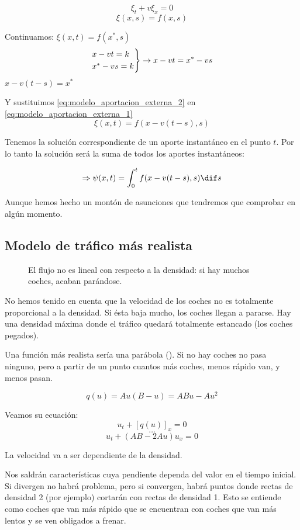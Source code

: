 			$$\xi_t + v\xi_x = 0$$
			$$\xi(x,s) = f(x,s)$$

			Continuamos:
			\(\xi(x,t) = f(x^*,s) \label{eq:modelo_aportacion_externa_1}\)
			$$
			\begin{rcases}
				x-vt = k \\
				x^* - vs = k
			\end{rcases}
			 \rightarrow x-vt = x^* - vs
			$$
			\( x-v(t-s) = x^{*} \label{eq:modelo_aportacion_externa_2} \)

			Y sustituimos \ref{eq:modelo_aportacion_externa_2} en \ref{eq:modelo_aportacion_externa_1}
			$$\xi(x,t) = f(x - v(t-s), s)$$


			Tenemos la solución correspondiente de un aporte instantáneo en el punto $t$. Por lo tanto la solución será la suma de todos los aportes instantáneos:

			$$\Rightarrow \psi(x,t) = \int^{t}_{0} f(x-v(t-s),s) \dif s $$

			Aunque hemos hecho un montón de asunciones que tendremos que comprobar en algún momento.

	\subsection{Modelo de tráfico más realista}

		\begin{wrapfigure}{r}{0.4\textwidth}
			\centering
			\caption{El flujo no es lineal con respecto a la densidad: si hay muchos coches, acaban parándose.}
			\label{fig:parabola}
		\end{wrapfigure}

		No hemos tenido en cuenta que la velocidad de los coches no es totalmente proporcional a la densidad. Si ésta baja mucho, los coches llegan a pararse. Hay una densidad máxima donde el tráfico quedará totalmente estancado (los coches pegados).

		Una función más realista sería una parábola (). Si no hay coches no pasa ninguno, pero a partir de un punto cuantos más coches, menos rápido van, y menos pasan.

		$$ q(u) = Au (B-u) = ABu - Au^{2} $$

		Veamos su ecuación:
		$$u_t + [q(u)]_x = 0$$
		$$ … $$
		$$ u_t + (AB - 2Au) u_x = 0 $$

		La velocidad va a ser dependiente de la densidad.

		Nos saldrán características cuya pendiente dependa del valor en el tiempo inicial. Si divergen no habrá problema, pero si convergen, habrá puntos donde rectas de densidad 2 (por ejemplo) cortarán con rectas de densidad 1. Esto se entiende como coches que van más rápido que se encuentran con coches que van más lentos y se ven obligados a frenar.


